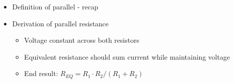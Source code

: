 \begin{itemize}
\item Definition of parallel - recap
\item Derivation of parallel resistance
  \begin{itemize}
  \item Voltage constant across both resistors
  \item Equivalent resistance should sum current while maintaining voltage
  \item End result: $R_{EQ}=R_1\cdot R_2 / (R_1 + R_2)$
  \end{itemize}
\end{itemize}
